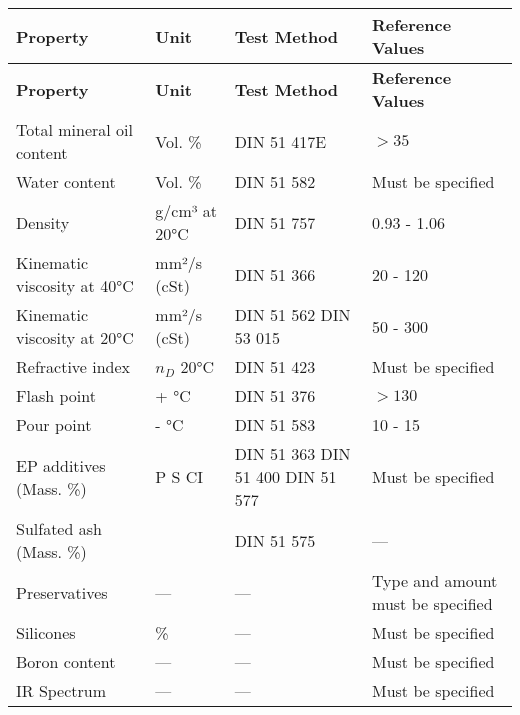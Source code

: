 \renewcommand{\arraystretch}{1.3}
\begin{longtable}{|p{6cm}|p{3cm}|p{3.5cm}|p{3.5cm}|}
    \hline
    \textbf{Property} & \textbf{Unit} & \textbf{Test Method} & \textbf{Reference Values} \\
    \hline
    \endfirsthead

    \hline
    \textbf{Property} & \textbf{Unit} & \textbf{Test Method} & \textbf{Reference Values} \\
    \hline
    \endhead

    \hline
    \endfoot

    \hline
    \endlastfoot

    Total mineral oil content & Vol. \% & DIN 51 417E & $> 35$ \\
    \hline
    Water content & Vol. \% & DIN 51 582 & Must be specified \\
    \hline
    Density & g/cm³ at 20°C & DIN 51 757 & 0.93 - 1.06 \\
    \hline
    Kinematic viscosity at 40°C & mm²/s (cSt) & DIN 51 366 & 20 - 120 \\
    \hline
    Kinematic viscosity at 20°C & mm²/s (cSt) & DIN 51 562 \newline DIN 53 015 & 50 - 300 \\
    \hline
    Refractive index & $n_D$ 20°C & DIN 51 423 & Must be specified \\
    \hline
    Flash point & + °C & DIN 51 376 & $> 130$ \\
    \hline
    Pour point & - °C & DIN 51 583 & 10 - 15 \\
    \hline
    EP additives (Mass. \%) & P \newline S \newline CI & DIN 51 363 \newline DIN 51 400 \newline DIN 51 577 & Must be specified \\
    \hline
    Sulfated ash (Mass. \%) &  & DIN 51 575 & --- \\
    \hline
    Preservatives & --- & --- & Type and amount must be specified \\
    \hline
    Silicones & \% & --- & Must be specified \\
    \hline
    Boron content & --- & --- & Must be specified \\
    \hline
    IR Spectrum & --- & --- & Must be specified \\
    \hline
\end{longtable}

